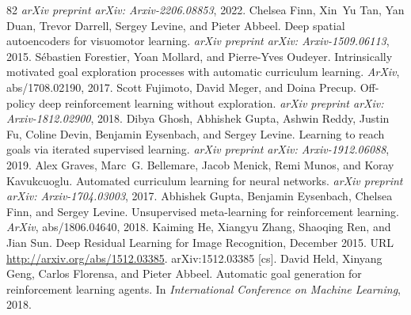 \documentclass{article}
\begin{document}
\begin{thebibliography}{82}
\newblock \emph{arXiv preprint arXiv: Arxiv-2206.08853}, 2022.
Chelsea Finn, Xin~Yu Tan, Yan Duan, Trevor Darrell, Sergey Levine, and Pieter Abbeel.
\newblock Deep spatial autoencoders for visuomotor learning.
\newblock \emph{arXiv preprint arXiv: Arxiv-1509.06113}, 2015.
S{\'e}bastien Forestier, Yoan Mollard, and Pierre-Yves Oudeyer.
\newblock Intrinsically motivated goal exploration processes with automatic curriculum learning.
\newblock \emph{ArXiv}, abs/1708.02190, 2017.
Scott Fujimoto, David Meger, and Doina Precup.
\newblock Off-policy deep reinforcement learning without exploration.
\newblock \emph{arXiv preprint arXiv: Arxiv-1812.02900}, 2018.
Dibya Ghosh, Abhishek Gupta, Ashwin Reddy, Justin Fu, Coline Devin, Benjamin Eysenbach, and Sergey Levine.
\newblock Learning to reach goals via iterated supervised learning.
\newblock \emph{arXiv preprint arXiv: Arxiv-1912.06088}, 2019.
Alex Graves, Marc~G. Bellemare, Jacob Menick, Remi Munos, and Koray Kavukcuoglu.
\newblock Automated curriculum learning for neural networks.
\newblock \emph{arXiv preprint arXiv: Arxiv-1704.03003}, 2017.
Abhishek Gupta, Benjamin Eysenbach, Chelsea Finn, and Sergey Levine.
\newblock Unsupervised meta-learning for reinforcement learning.
\newblock \emph{ArXiv}, abs/1806.04640, 2018.
Kaiming He, Xiangyu Zhang, Shaoqing Ren, and Jian Sun.
\newblock Deep {Residual} {Learning} for {Image} {Recognition}, December 2015.
\newblock URL \url{http://arxiv.org/abs/1512.03385}.
\newblock arXiv:1512.03385 [cs].
David Held, Xinyang Geng, Carlos Florensa, and Pieter Abbeel.
\newblock Automatic goal generation for reinforcement learning agents.
\newblock In \emph{International Conference on Machine Learning}, 2018.

\end{thebibliography}
\end{document}
